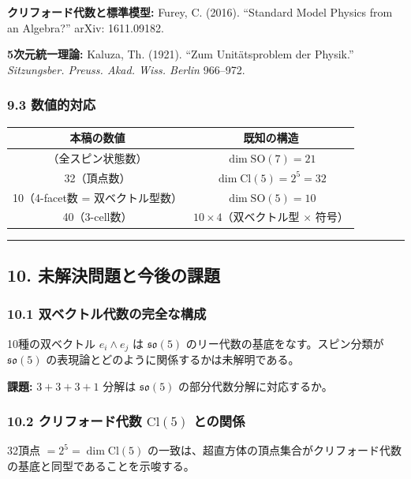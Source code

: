 \documentclass[a4paper,11pt]{ltjsarticle}
\newcounter{none}
\begin{document}
\textbf{クリフォード代数と標準模型:} Furey, C. (2016). ``Standard Model Physics from an Algebra?'' arXiv: 1611.09182.

\textbf{5次元統一理論:} Kaluza, Th. (1921). ``Zum Unitätsproblem der Physik.'' \emph{Sitzungsber. Preuss. Akad. Wiss. Berlin} 966--972.

\subsubsection*{9.3 数値的対応}

{\def\LTcaptype{none}
\begin{longtable}[]{@{}cc@{}}
\toprule
本稿の数値 & 既知の構造 \\
\midrule
\endhead
\bottomrule
\endlastfoot
21（全スピン状態数） & $\dim \mathrm{SO}(7) = 21$ \\
32（頂点数） & $\dim \mathrm{Cl}(5) = 2^5 = 32$ \\
10（4-facet数 = 双ベクトル型数） & $\dim \mathrm{SO}(5) = 10$ \\
40（3-cell数） & $10 \times 4$（双ベクトル型 $\times$ 符号） \\
\end{longtable}
}

\begin{center}\rule{0.5\linewidth}{0.5pt}\end{center}

\subsection*{10. 未解決問題と今後の課題}

\subsubsection*{10.1 双ベクトル代数の完全な構成}

10種の双ベクトル $e_i \wedge e_j$ は $\mathfrak{so}(5)$ のリー代数の基底をなす。スピン分類が $\mathfrak{so}(5)$ の表現論とどのように関係するかは未解明である。

\textbf{課題:} $3 + 3 + 3 + 1$ 分解は $\mathfrak{so}(5)$ の部分代数分解に対応するか。

\subsubsection*{10.2 クリフォード代数 $\mathrm{Cl}(5)$ との関係}

32頂点 $= 2^5 = \dim \mathrm{Cl}(5)$ の一致は、超直方体の頂点集合がクリフォード代数の基底と同型であることを示唆する。
\end{document}
